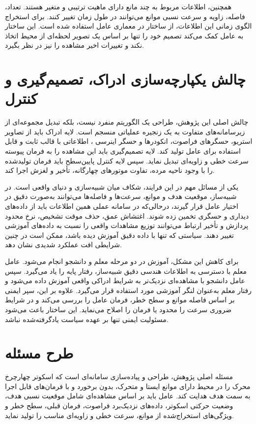 همچنین، اطلاعات مربوط به چند مانع دارای ماهیت ترتیبی و متغیر هستند. تعداد، فاصله، زاویه و سرعت نسبی موانع می‌توانند در طول زمان تغییر کنند. برای استخراج الگوی زمانی این اطلاعات، از ساختار  در معماری عامل استفاده شده است. این ساختار به عامل کمک می‌کند تصمیم خود را تنها بر اساس یک تصویر لحظه‌ای از محیط اتخاذ نکند و تغییرات اخیر مشاهده را نیز در نظر بگیرد.

\section{چالش یکپارچه‌سازی ادراک، تصمیم‌گیری و کنترل}

چالش اصلی این پژوهش، طراحی یک الگوریتم منفرد نیست، بلکه تبدیل مجموعه‌ای از زیرسامانه‌های متفاوت به یک زنجیره عملیاتی منسجم است. لایه ادراک باید از تصاویر استریو، حسگرهای فراصوت، انکودرها و حسگر اینرسی%
، اطلاعاتی با قالب ثابت و قابل استفاده برای عامل تولید کند. لایه تصمیم‌گیری باید این مشاهده را به فرمان پیوسته سرعت خطی و زاویه‌ای تبدیل نماید. سپس لایه کنترل پایین‌سطح باید فرمان تولیدشده را با وجود ناحیه مرده، تفاوت موتورهای چهارگانه، تأخیر و لغزش اجرا کند.

یکی از مسائل مهم در این فرایند، شکاف میان شبیه‌سازی و دنیای واقعی است. در شبیه‌ساز، موقعیت هدف و موانع، سرعت‌ها و فاصله‌ها می‌توانند به‌صورت دقیق در اختیار عامل قرار گیرند، درحالی‌که در سامانه عملی همین اطلاعات باید از داده‌های دیداری و حسگری تخمین زده شوند. اغتشاش عمق، حذف موقت تشخیص، نرخ محدود پردازش و تأخیر ارتباط می‌توانند توزیع مشاهدات واقعی را نسبت به داده‌های آموزشی تغییر دهند. سیاستی که تنها با داده دقیق آموزش دیده باشد، ممکن است در چنین شرایطی افت عملکرد شدیدی نشان دهد.

برای کاهش این مشکل، آموزش در دو مرحله معلم و دانشجو انجام می‌شود. عامل معلم با دسترسی به اطلاعات هندسی دقیق شبیه‌ساز، رفتار پایه را یاد می‌گیرد. سپس عامل دانشجو با مشاهده‌ای نزدیک‌تر به شرایط ادراکی واقعی آموزش داده می‌شود و رفتار معلم به‌عنوان لنگر آموزشی مورد استفاده قرار می‌گیرد. علاوه بر این، سپر ایمنی بر اساس فاصله موانع و سطح خطر، فرمان عامل را بررسی می‌کند و در شرایط ضروری سرعت را محدود یا فرمان را اصلاح می‌نماید. این ساختار باعث می‌شود مسئولیت ایمنی تنها بر عهده سیاست یادگرفته‌شده نباشد.

\section{طرح مسئله}

مسئله اصلی پژوهش، طراحی و پیاده‌سازی سامانه‌ای است که اسکوتر چهارچرخ محرک را در محیط دارای موانع ایستا و متحرک، بدون برخورد و با فرمان‌های قابل اجرا به سمت هدف هدایت کند. عامل باید بر اساس مشاهده‌ای شامل موقعیت نسبی هدف، وضعیت حرکتی اسکوتر، داده‌های نزدیک‌برد فراصوت، فرمان قبلی، سطح خطر و ویژگی‌های استخراج‌شده از موانع، سرعت خطی و زاویه‌ای مناسب را تولید نماید.

